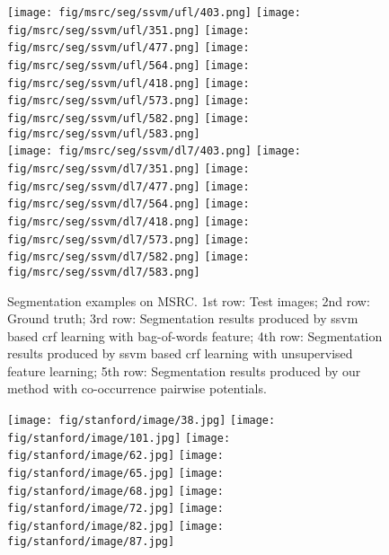 \documentclass[10pt,3p]{elsarticle}
\newcommand{\ssvm}{{\sc ssvm}\xspace}
\newcommand{\crf}{{\sc crf}\xspace}
\begin{document}
\begin{figure}[!t]
	\texttt{[image: fig/msrc/seg/ssvm/ufl/403.png]}
     \texttt{[image: fig/msrc/seg/ssvm/ufl/351.png]}     
	\texttt{[image: fig/msrc/seg/ssvm/ufl/477.png]}
    \texttt{[image: fig/msrc/seg/ssvm/ufl/564.png]}
     \texttt{[image: fig/msrc/seg/ssvm/ufl/418.png]}
     \texttt{[image: fig/msrc/seg/ssvm/ufl/573.png]}   
     \texttt{[image: fig/msrc/seg/ssvm/ufl/582.png]} 
     \texttt{[image: fig/msrc/seg/ssvm/ufl/583.png]}\\
     
     
     \texttt{[image: fig/msrc/seg/ssvm/dl7/403.png]}
     \texttt{[image: fig/msrc/seg/ssvm/dl7/351.png]}     
	\texttt{[image: fig/msrc/seg/ssvm/dl7/477.png]}
    \texttt{[image: fig/msrc/seg/ssvm/dl7/564.png]}
     \texttt{[image: fig/msrc/seg/ssvm/dl7/418.png]}
     \texttt{[image: fig/msrc/seg/ssvm/dl7/573.png]}   
     \texttt{[image: fig/msrc/seg/ssvm/dl7/582.png]} 
     \texttt{[image: fig/msrc/seg/ssvm/dl7/583.png]}\\

\caption{Segmentation examples on MSRC. 1st row: Test images; 2nd row: Ground truth; 
3rd row: Segmentation results produced by \ssvm based \crf learning with bag-of-words feature;
4th row: Segmentation results produced by \ssvm based \crf learning with unsupervised feature learning; 
5th row: Segmentation results produced by our method with co-occurrence pairwise potentials. }
    \label{fig:seg_msrc}      
\end{figure}\begin{figure}[!t]
\centering
	\texttt{[image: fig/stanford/image/38.jpg]}
     \texttt{[image: fig/stanford/image/101.jpg]}     
	\texttt{[image: fig/stanford/image/62.jpg]}
    \texttt{[image: fig/stanford/image/65.jpg]}
     \texttt{[image: fig/stanford/image/68.jpg]}
     \texttt{[image: fig/stanford/image/72.jpg]}   
     \texttt{[image: fig/stanford/image/82.jpg]} 
     \texttt{[image: fig/stanford/image/87.jpg]}\\
     

\end{figure}
\end{document}
